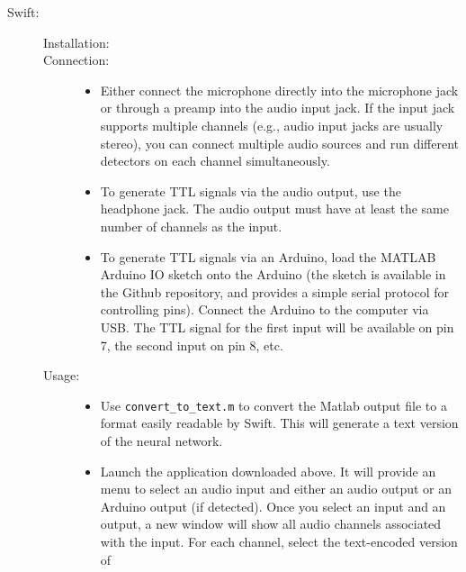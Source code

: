 \documentclass[10pt,letterpaper]{article}
\begin{document}
\begin{description}
\begin{description}
  \item[Swift:]\hfill
    \begin{description}
    \item[Installation:]\hfill
    \item[Connection:]\hfill
      \begin{itemize}
      \item Either connect the microphone directly into the microphone jack or through a 
      preamp into the audio input jack. If the input jack supports multiple channels (e.g., 
      audio input jacks are usually stereo), you can connect multiple audio sources and run 
      different detectors on each channel simultaneously.
      \item To generate TTL signals via the audio output, use the headphone jack. The 
      audio output must have at least the same number of channels as the input.
      \item To generate TTL signals via an Arduino, load the MATLAB Arduino IO sketch 
      onto the Arduino (the sketch is available in the Github repository, and provides a 
      simple serial protocol for controlling pins). Connect the Arduino 
      to the computer via USB. The TTL signal for the first input will be available on 
      pin 7, the second input on pin 8, etc.
      \end{itemize}
    \item[Usage:]\hfill
      \begin{itemize}
      \item Use {\tt convert\_to\_text.m} to convert the Matlab output file to a format 
      easily readable by Swift. This will generate a text version of the neural network.
      \item Launch the application downloaded above. It will provide an 
      menu to select an audio input and either an audio output or an Arduino output (if 
      detected). Once you select an input and an output, a new window will show all audio 
      channels associated with the input. For each channel, select the text-encoded version of 

\end{itemize}
\end{description}
\end{description}
\end{description}
\end{document}
